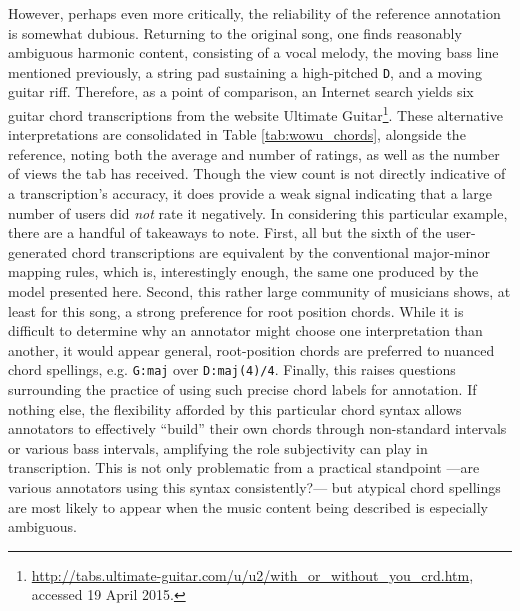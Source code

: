 However, perhaps even more critically, the reliability of the reference annotation is somewhat dubious.
Returning to the original song, one finds reasonably ambiguous harmonic content, consisting of a vocal melody, the moving bass line mentioned previously, a string pad sustaining a high-pitched \texttt{D}, and a moving guitar riff.
Therefore, as a point of comparison, an Internet search yields six guitar chord transcriptions from the website Ultimate Guitar\footnote{\url{http://tabs.ultimate-guitar.com/u/u2/with_or_without_you_crd.htm},  accessed 19 April 2015.}.
These alternative interpretations are consolidated in Table \ref{tab:wowu_chords}, alongside the reference, noting both the average and number of ratings, as well as the number of views the tab has received.
Though the view count is not directly indicative of a transcription's accuracy, it does provide a weak signal indicating that a large number of users did \emph{not} rate it negatively.
In considering this particular example, there are a handful of takeaways to note.
First, all but the sixth of the user-generated chord transcriptions are equivalent by the conventional major-minor mapping rules, which is, interestingly enough, the same one produced by the model presented here.
Second, this rather large community of musicians shows, at least for this song, a strong preference for root position chords.
While it is difficult to determine why an annotator might choose one interpretation than another, it would appear general, root-position chords are preferred to nuanced chord spellings, e.g. \texttt{G:maj} over \texttt{D:maj(4)/4}.
Finally, this raises questions surrounding the practice of using such precise chord labels for annotation.
If nothing else, the flexibility afforded by this particular chord syntax allows annotators to effectively ``build'' their own chords through non-standard intervals or various bass intervals, amplifying the role subjectivity can play in transcription.
This is not only problematic from a practical standpoint ---are various annotators using this syntax consistently?--- but atypical chord spellings are most likely to appear when the music content being described is especially ambiguous.


